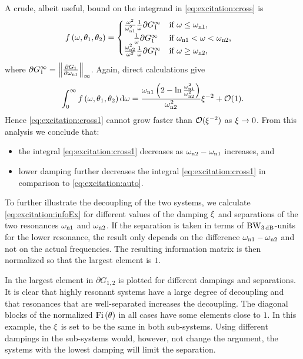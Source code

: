 A crude, albeit useful, bound on the integrand in \eqref{eq:excitation:cross} is
\begin{align}
&f\left(\omega,\theta_1,\theta_2\right)=
  \begin{cases}
   \frac{\omega^2}{\wn[1]^2}
   \frac{1}{\omega}
   \partial G_1^\infty
                                       & \text{if $\omega \leq \wn[1]$,}\\
   \phantom{\frac{\omega^2}{\omega^2}}
   \frac{1}{\omega}
   \partial G_1^\infty
                                       & \text{if $\wn[1] < \omega < \wn[2]$,}\\
   \frac{\wn[2]^2}{\omega^2}
   \frac{1}{\omega}
   \partial G_1^\infty
                                       & \text{if $\omega \geq \wn[2]$,}
  \end{cases}
\end{align}
where $\partial G_1^\infty = \left\|\frac{\partial G_1}{\partial \wn[1]}\right\|_\infty$. 
Again, direct calculations give
\begin{align}
\int_0^\infty f\left(\omega,\theta_1,\theta_2\right)\dd\omega = \frac{\wn[1]\left(2-\ln{\frac{\wn[1]^2}{\wn[2]^2}}\right)}{\wn[2]^2}\damping^{-2} + \mathcal{O}(1).
\end{align}
Hence \eqref{eq:excitation:cross1} cannot grow faster than $\mathcal{O}(\damping^{-2})$ as $\damping\rightarrow0$. From this analysis we conclude that:
\begin{itemize}
\item the integral \eqref{eq:excitation:cross1} decreases as $\wn[2]-\wn[1]$ increases, and
\item lower damping further decreases the integral \eqref{eq:excitation:cross1} in comparison to \eqref{eq:excitation:auto}.
\end{itemize}

To further illustrate the decoupling of the two systems, we calculate \eqref{eq:excitation:infoEx} for different values of the damping $\damping$ and separations of the two resonances $\wn[1]$ and $\wn[2]$. If the separation is taken in terms of $\wdB$-units for the lower resonance, the result only depends on the difference $\wn[1]-\wn[2]$ and not on the actual frequencies. The resulting information matrix is then normalized so that the largest element is $1$.

In  the largest element in $\partial G_{1,2}$ is plotted for different dampings and separations. It is clear that highly resonant systems have a large degree of decoupling and that resonances that are well-separated increases the decoupling. 
The diagonal blocks of the normalized $\Fi{\theta}$ in all cases have some elements close to $1$. 
In this example, the $\damping$ is set to be the same in both sub-systems. 
Using different dampings in the sub-systems would, however, not change the argument, the systems with the lowest damping will limit the separation.


